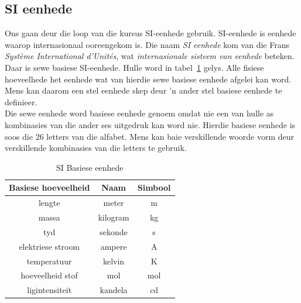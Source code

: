 \subsection*{SI eenhede}
            \nopagebreak
Ons gaan deur die loop van die kursus SI-eenhede gebruik. SI-eenhede is eenhede waarop internasionaal ooreengekom is.
  {Die naam \textsl{SI eenhede} kom van die Frans \textsl{Syst\`{e}me International d'Unit\'{e}s}, wat \textsl{internasionale sisteem van eenhede} beteken.  } 
Daar is sewe basiese SI-eenhede. Hulle word in tabel~\ref{tab:units:SIunits} gelys. Alle fisiese hoeveelhede het eenhede wat van hierdie sewe basiese eenhede afgelei kan word. Mens kan daarom een stel eenhede skep deur  'n ander stel basiese eenhede te definieer. \\
Die sewe eenhede word basiese eenhede genoem omdat nie een van hulle as kombinasies van die ander ses uitgedruk kan word nie. Hierdie basiese eenhede is soos die 26 letters van die alfabet. Mens kan baie verskillende woorde vorm deur verskillende kombinasies van die letters te gebruik.\par 
\begin{table}[H]
\centering
\begin{tabular}{|c|c|c|}\hline
\textbf{Basiese hoeveelheid} & \textbf{Naam} & \textbf{Simbool} \\
\hline lengte & meter & m\\ \hline 
massa & kilogram & kg\\ \hline 
tyd & sekonde & s\\ \hline 
elektriese stroom & ampere& A\\ \hline 
temperatuur & kelvin & K\\ \hline 
hoeveelheid stof & mol & mol\\ \hline 
ligintensiteit & kandela & cd\\ \hline
\end{tabular}
\caption{SI Basiese eenhede}\label{tab:units:SIunits}
\end{table}
